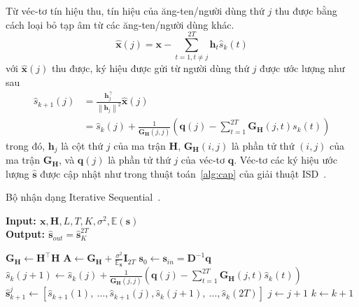 Từ véc-tơ tín hiệu thu, tín hiệu của ăng-ten/người dùng thứ $j$ thu được bằng cách loại bỏ tạp âm từ các ăng-ten/người dùng khác.
\begin{equation}
    \hat{\mathbf{x}}(j)=\mathbf{x}-\sum_{t=1, t \neq j}^{2T} \mathbf{h}_t \hat{s}_k(t)
\end{equation}
với $\hat{\mathbf{x}}(j)$ thu được, ký hiệu được gửi từ người dùng thứ $j$ được ước lượng như sau
\begin{equation}
\label{eq:supdate}
    \begin{aligned}
        \hat{s}_{k+1}(j) & =\frac{\mathbf{h}_j^\top}{\left\|\mathbf{h}_j\right\|^2} \hat{\mathbf{x}}(j) \\ 
        & = \hat{s}_k(j)+\frac{1}{\mathbf{G}_\mathbf{H}(j, j)}\left(\mathbf{q}(j)-\sum_{t=1}^{2T} \mathbf{G}_\mathbf{H}(j, t) s_k(t)\right)
    \end{aligned}
\end{equation}
trong đó, $\mathbf{h}_j$ là cột thứ $j$ của ma trận $\mathbf{H}$, $\mathbf{G}_\mathbf{H}(i, j)$ là phần tử thứ $(i, j)$ của ma trận $\mathbf{G}_\mathbf{H}$, và $\mathbf{q}(j)$ là phần tử thứ $j$ của véc-tơ $\mathbf{q}$. Véc-tơ các ký hiệu ước lượng $\hat{\mathbf{s}}$ được cập nhật như trong thuật toán~\ref{alg:cap} của giải thuật ISD~\cite{Mandloi2017}. 
\begin{algorithm}[ht]
    \caption{Bộ nhận dạng Iterative Sequential~\cite{Mandloi2017}.}\label{alg:cap}
    \hspace*{\algorithmicindent} \textbf{Input: $\mathbf{x}, \mathbf{H}, L, T, K, \sigma^2, \mathbb{E}(\mathbf{s})$} \\
    \hspace*{\algorithmicindent} \textbf{Output: $\hat{\mathbf{s}}_{out} = \hat{\mathbf{s}}^{2T}_K$} 
    \begin{algorithmic}[1]
        \State $\mathbf{G}_\mathbf{H} \leftarrow \mathbf{H}^\top \mathbf{H}$
        \State $\mathbf{A} \leftarrow \mathbf{G}_\mathbf{H} + \frac{\sigma^2}{\mathbb{E}_\mathbf{x}} \mathbf{I}_{2T}$
        \State $\mathbf{s}_0 \leftarrow \mathbf{s}_{in} = \mathbf{D}^{-1} \mathbf{q}$ \\
                \State $\hat{s}_k(j+1) \leftarrow \hat{s}_k(j)+\frac{1}{\mathbf{G}_\mathbf{H}(j, j)}\left(\mathbf{q}(j)-\sum_{t=1}^{2T} \mathbf{G}_\mathbf{H}(j, t) \hat{s}_k(t)\right)$ \\ 
                \State $\hat{\mathbf{s}}_{k+1}^j \leftarrow\left[\hat{s}_{k+1}(1),~\ldots, \hat{s}_{k+1}(j), \hat{s}_k(j+1),~\ldots, \hat{s}_k(2T)\right]$
                \State $j \leftarrow j + 1$
            \EndFor
            \State $k \leftarrow k + 1$
        \EndFor
    \end{algorithmic}
\end{algorithm}

